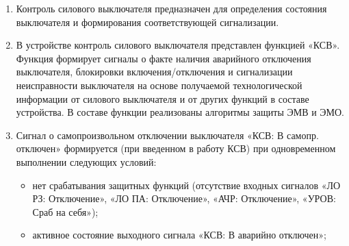 
\color{black}

\begin{enumerate}

\item
Контроль силового выключателя предназначен для определения состояния выключателя и формирования соответствующей сигнализации. 

\item
В устройстве контроль силового выключателя представлен функцией «КСВ». Функция формирует сигналы о факте наличия аварийного отключения выключателя, блокировки включения/отключения и сигнализации неисправности выключателя на основе получаемой технологической информации от силового выключателя и от других функций в составе устройства. В составе функции реализованы алгоритмы защиты ЭМВ и ЭМО.

\item
Сигнал о самопроизвольном отключении выключателя «КСВ: В самопр. отключен» формируется (при введенном в работу КСВ) при одновременном выполнении следующих условий:
\begin{itemize}
\item нет срабатывания защитных функций (отсутствие входных сигналов «ЛО РЗ: Отключение», «ЛО ПА: Отключение», «АЧР: Отключение», «УРОВ: Сраб на себя»);
\item активное состояние выходного сигнала «КСВ: В аварийно отключен»;
\end{itemize}


\end{enumerate}
